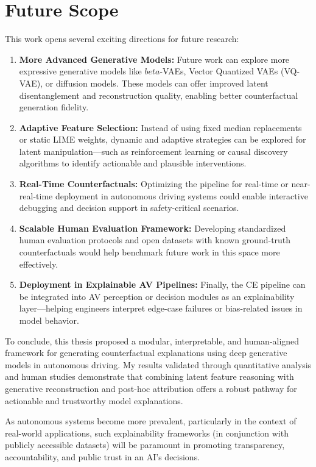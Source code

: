 \section{Future Scope}
This work opens several exciting directions for future research:
\begin{enumerate}
    \item \textbf{More Advanced Generative Models:} Future work can explore more expressive generative models like $beta$-VAEs, Vector Quantized VAEs (VQ-VAE), or diffusion models. These models can offer improved latent disentanglement and reconstruction quality, enabling better counterfactual generation fidelity.
    \item \textbf{Adaptive Feature Selection:} Instead of using fixed median replacements or static LIME weights, dynamic and adaptive strategies can be explored for latent manipulation—such as reinforcement learning or causal discovery algorithms to identify actionable and plausible interventions.
    \item \textbf{Real-Time Counterfactuals:} Optimizing the pipeline for real-time or near-real-time deployment in autonomous driving systems could enable interactive debugging and decision support in safety-critical scenarios.

    \item \textbf{Scalable Human Evaluation Framework:} Developing standardized human evaluation protocols and open datasets with known ground-truth counterfactuals would help benchmark future work in this space more effectively.
    \item \textbf{Deployment in Explainable AV Pipelines:} Finally, the CE pipeline can be integrated into AV perception or decision modules as an explainability layer—helping engineers interpret edge-case failures or bias-related issues in model behavior.
\end{enumerate}


To conclude, this thesis proposed a modular, interpretable, and human-aligned framework for generating counterfactual explanations using deep generative models in autonomous driving. My results validated through quantitative analysis and human studies demonstrate that combining latent feature reasoning with generative reconstruction and post-hoc attribution offers a robust pathway for actionable and trustworthy model explanations.

As autonomous systems become more prevalent, particularly in the context of real-world applications, such explainability frameworks (in conjunction with publicly accessible datasets) will be paramount in promoting transparency, accountability, and public trust in an AI’s decisions.